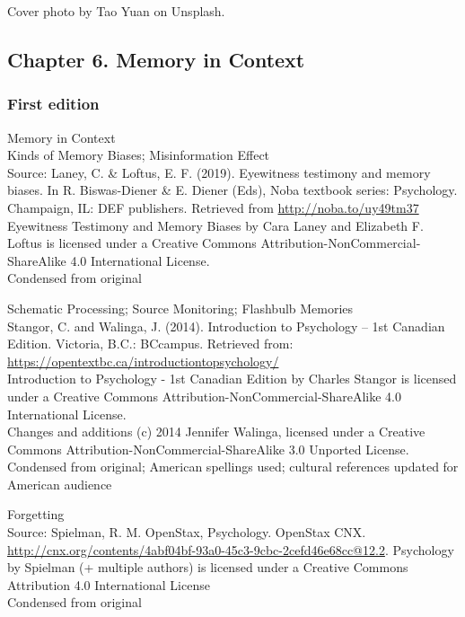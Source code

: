 \documentclass[
]{krantz}
\begin{document}
Cover photo by Tao Yuan on Unsplash.

\subsection*{Chapter 6. Memory in Context}\label{chapter-6.-memory-in-context}


\subsubsection*{First edition}\label{first-edition-6}


Memory in Context\\
Kinds of Memory Biases; Misinformation Effect\\
Source: Laney, C. \& Loftus, E. F. (2019). Eyewitness testimony and memory biases. In R. Biswas-Diener \& E. Diener (Eds), Noba textbook series: Psychology. Champaign, IL: DEF publishers. Retrieved from \url{http://noba.to/uy49tm37}\\
Eyewitness Testimony and Memory Biases by Cara Laney and Elizabeth F. Loftus is licensed under a Creative Commons Attribution-NonCommercial-ShareAlike 4.0 International License.\\
Condensed from original

Schematic Processing; Source Monitoring; Flashbulb Memories\\
Stangor, C. and Walinga, J. (2014). Introduction to Psychology -- 1st Canadian Edition. Victoria, B.C.: BCcampus. Retrieved from: \url{https://opentextbc.ca/introductiontopsychology/}\\
Introduction to Psychology - 1st Canadian Edition by Charles Stangor is licensed under a Creative Commons Attribution-NonCommercial-ShareAlike 4.0 International License.\\
Changes and additions (c) 2014 Jennifer Walinga, licensed under a Creative Commons Attribution-NonCommercial-ShareAlike 3.0 Unported License.\\
Condensed from original; American spellings used; cultural references updated for American audience

Forgetting\\
Source: Spielman, R. M. OpenStax, Psychology. OpenStax CNX. \url{http://cnx.org/contents/4abf04bf-93a0-45c3-9cbc-2cefd46e68cc@12.2}.
Psychology by Spielman (+ multiple authors) is licensed under a Creative Commons Attribution 4.0 International License\\
Condensed from original
\end{document}
